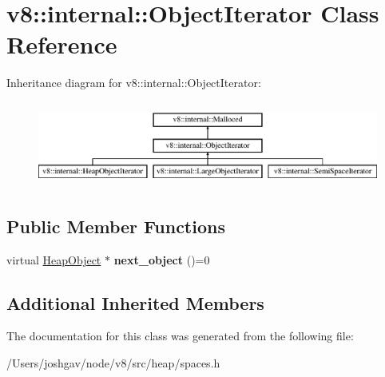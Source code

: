 \hypertarget{classv8_1_1internal_1_1_object_iterator}{}\section{v8\+:\+:internal\+:\+:Object\+Iterator Class Reference}
\label{classv8_1_1internal_1_1_object_iterator}
Inheritance diagram for v8\+:\+:internal\+:\+:Object\+Iterator\+:\begin{figure}[H]
\begin{center}
\leavevmode
\includegraphics[height=2.828283cm]{classv8_1_1internal_1_1_object_iterator}
\end{center}
\end{figure}
\subsection*{Public Member Functions}
\begin{DoxyCompactItemize}
\item 
virtual \hyperlink{classv8_1_1internal_1_1_heap_object}{Heap\+Object} $\ast$ {\bfseries next\+\_\+object} ()=0\hypertarget{classv8_1_1internal_1_1_object_iterator_ab988c2f88aa1170c77c04f647858c52e}{}\label{classv8_1_1internal_1_1_object_iterator_ab988c2f88aa1170c77c04f647858c52e}

\end{DoxyCompactItemize}
\subsection*{Additional Inherited Members}


The documentation for this class was generated from the following file\+:\begin{DoxyCompactItemize}
\item 
/\+Users/joshgav/node/v8/src/heap/spaces.\+h\end{DoxyCompactItemize}
